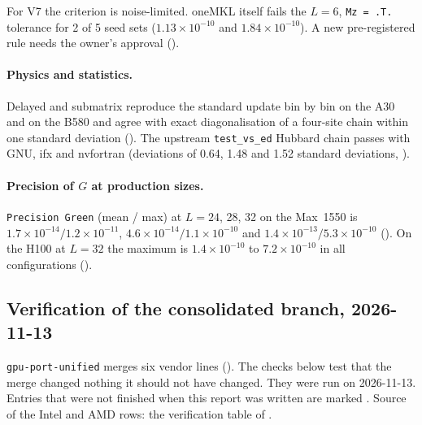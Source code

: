 For V7 the criterion is noise-limited. oneMKL itself fails the $L=6$, \texttt{Mz = .T.} tolerance for 2 of 5 seed sets ($1.13\times10^{-10}$ and $1.84\times10^{-10}$). A new pre-registered rule needs the owner's approval ().

\paragraph{Physics and statistics.} Delayed and submatrix reproduce the standard update bin by bin on the A30 and on the B580 and agree with exact diagonalisation of a four-site chain within one standard deviation (). The upstream \texttt{test\_vs\_ed} Hubbard chain passes with GNU, ifx and nvfortran (deviations of 0.64, 1.48 and 1.52 standard deviations, ).

\paragraph{Precision of $G$ at production sizes.} \texttt{Precision Green} (mean / max) at $L=24$, 28, 32 on the Max~1550 is $1.7\times10^{-14}/1.2\times10^{-11}$, $4.6\times10^{-14}/1.1\times10^{-10}$ and $1.4\times10^{-13}/5.3\times10^{-10}$ (). On the H100 at $L=32$ the maximum is $1.4\times10^{-10}$ to $7.2\times10^{-10}$ in all configurations ().

\subsection{Verification of the consolidated branch, 2026-11-13}
\label{sec:verif1113}

\texttt{gpu-port-unified} merges six vendor lines (). The checks below test that the merge changed nothing it should not have changed. They were run on 2026-11-13. Entries that were not finished when this report was written are marked . Source of the Intel and AMD rows: the verification table of .

